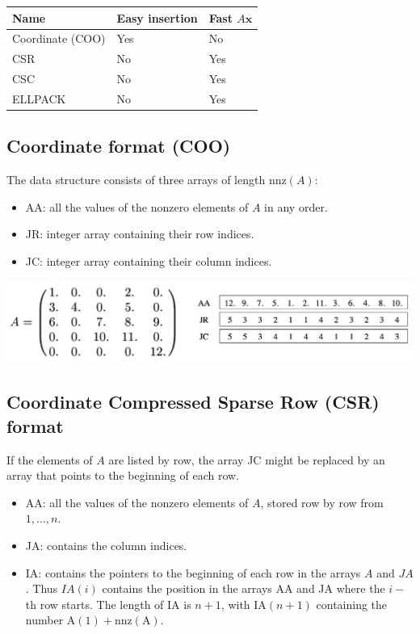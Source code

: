 \documentclass[11pt]{book}
\begin{document}
\begin{center}
\begin{tabular}{l|l|l|}
Name & Easy insertion & Fast $A \mathbf{x}$ \\
\hline
Coordinate (COO) & Yes & No \\
CSR & No & Yes \\
CSC & No & Yes \\
ELLPACK & No & Yes \\
\end{tabular}
\end{center}

\subsection*{Coordinate format (COO)}
The data structure consists of three arrays of length $\mathrm{nnz}(A)$:

\begin{itemize}
  \item AA: all the values of the nonzero elements of $A$ in any order.

  \item JR: integer array containing their row indices.

  \item JC: integer array containing their column indices.

\end{itemize}

\begin{center}
\includegraphics[max width=\textwidth]{2023_09_05_b72ccc85584d9dc6fb5cg-025}
\end{center}

\subsection*{Coordinate Compressed Sparse Row (CSR) format}
If the elements of $A$ are listed by row, the array JC might be replaced by an array that points to the beginning of each row.

\begin{itemize}
  \item AA: all the values of the nonzero elements of $A$, stored row by row from $1, \ldots, n$.

  \item JA: contains the column indices.

  \item IA: contains the pointers to the beginning of each row in the arrays $A$ and $J A$. Thus $I A(i)$ contains the position in the arrays AA and JA where the $i-$ th row starts. The length of IA is $n+1$, with $\mathrm{IA}(n+1)$ containing the number $\mathrm{A}(1)+\mathrm{nnz}(\mathrm{A})$.

\end{itemize}
\end{document}
